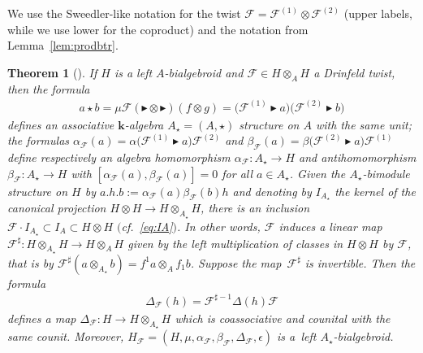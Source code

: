 \documentclass[pdftex]{sigma}
\newtheorem{Theorem}{Theorem}[section]
\numberwithin{equation}{section}
\begin{document}
We use the Sweedler-like notation for the twist $\mathcal{F} = \mathcal{F}^{(1)}\otimes\mathcal{F}^{(2)}$ (upper labels, while we use lower for the coproduct) and the notation from Lemma~\ref{lem:prodbtr}.
\begin{Theorem}[\cite{xu}]\label{th:cocycimpltw}
If $H$ is a left $A$-bialgebroid and $\mathcal{F}\in H\otimes_A H$ a Drinfeld twist, then the formula
\begin{gather}\label{eq:starfromF}
a\star b = \mu\mathcal{F}(\blacktriangleright\otimes\blacktriangleright)(f\otimes g) = \big(\mathcal{F}^{(1)}\blacktriangleright a\big) \big(\mathcal{F}^{(2)}\blacktriangleright b\big)
\end{gather}
defines an associative $\mathbf{k}$-algebra $A_\star = (A,\star)$ structure on $A$ with the same unit; the formulas $\alpha_{\mathcal{F}}(a) = \alpha\big(\mathcal{F}^{(1)}\blacktriangleright a\big)\mathcal{F}^{(2)}$ and $\beta_{\mathcal{F}}(a) = \beta\big(\mathcal{F}^{(2)}\blacktriangleright a\big)\mathcal{F}^{(1)}$ define respectively an algebra homomorphism $\alpha_{\mathcal{F}}\colon A_\star\to H$ and antihomomorphism $\beta_{\mathcal{F}}\colon A_\star\to H$ with $[\alpha_{\mathcal{F}}(a),\beta_{\mathcal{F}}(a)] = 0$ for all $a\in A_\star$. Given the $A_\star$-bimodule structure on $H$ by $a.h.b := \alpha_{\mathcal{F}}(a)\beta_{\mathcal{F}}(b)h$ and denoting by $I_{A_\star}$ the kernel of the canonical projection $H\otimes H\to H\otimes_{A_\star} H$, there is an inclusion $\mathcal{F} \cdot I_{A_\star}\subset I_A \subset H\otimes H$ $($cf.~\eqref{eq:IA}$)$. In other words, $\mathcal{F}$ induces a linear map $\mathcal{F}^\sharp\colon H\otimes_{A_\star} H\to H\otimes_{A}H$ given by the left multiplication of classes in $H\otimes H$ by $\mathcal{F}$, that is by $\mathcal{F}^\sharp(a\otimes_{A_\star} b) = f^1 a\otimes_{A} f_1 b$. Suppose the map~$\mathcal{F}^\sharp$ is invertible. Then the formula
\begin{gather*}
\Delta_{\mathcal{F}}(h) = \mathcal{F}^{\sharp -1}\Delta(h)\mathcal{F}
\end{gather*}
defines a map $\Delta_{\mathcal{F}}\colon H\to H\otimes_{A_\star} H$ which is coassociative and counital with the same counit. Moreover, $H_{\mathcal{F}} = (H,\mu,\alpha_{\mathcal{F}},\beta_{\mathcal{F}},\Delta_{\mathcal{F}},\epsilon)$ is a~left $A_\star$-bialgebroid.
\end{Theorem}
\end{document}
